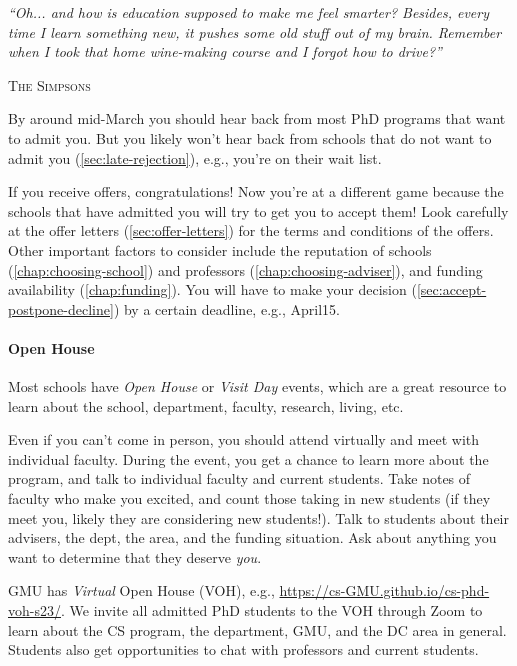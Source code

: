 \documentclass[oneside,11pt]{book}
\newcommand{\myepigraphsimpsons}[1]{
  \epigraph{\vspace{-0.2in} \emph{#1}}{\textsc{The Simpsons}}
}
\newenvironment{commentbox}[1][]{
  \small
  \begin{marker}[\faChessPawn{}]
    {\textbf{#1}}
  }{
  \end{marker}
}
\begin{document}
\myepigraphsimpsons{``Oh... and how is education supposed to make me feel smarter? Besides, every time I learn something new, it pushes some old stuff out of my brain. Remember when I took that home wine-making course and I forgot how to drive?''}

By around mid-March you should hear back from most PhD programs that want to admit you. 
But you likely won't hear back from schools that do not want to admit you (\autoref{sec:late-rejection}), e.g., you're on their wait list.

If you receive offers, congratulations!  Now you're at a different game because the schools that have admitted you will try to get you to accept them!  Look carefully at the offer letters (\autoref{sec:offer-letters}) for the terms and conditions of the offers.  Other important factors to consider include the reputation of schools (\autoref{chap:choosing-school}) and professors (\autoref{chap:choosing-adviser}), and funding availability (\autoref{chap:funding}). You will have to make your decision (\autoref{sec:accept-postpone-decline}) by a certain deadline, e.g., \gls{April15}.

\paragraph{Open House} Most schools have \emph{Open House} or \emph{Visit Day} events, which are a great resource to learn about the school, department, faculty, research, living, etc.

Even if you can't come in person, you should attend virtually and meet with individual faculty. During the event, you get a chance to learn more about the program, and talk to individual faculty and current students.  Take notes of faculty who make you excited, and count those taking in new students (if they meet you, likely they are considering new students!).  Talk to students about their advisers, the dept, the area, and the funding situation.  Ask about anything you want to determine that they deserve \emph{you}.

\begin{commentbox}
  GMU has \emph{Virtual} Open House (VOH), e.g., \url{https://cs-GMU.github.io/cs-phd-voh-s23/}. We invite all admitted PhD students to the VOH through Zoom to learn about the CS program, the department, GMU, and the DC area in general. Students also get opportunities to chat with professors and current students.
\end{commentbox}
\end{document}

